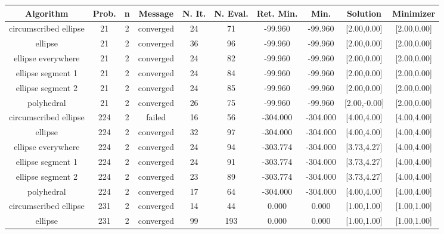 \begin{tiny}

\begin{center}
\begin{tabular}{ c c c c c c c c c c }
Algorithm & Prob. & n & Message & N. It. & N. Eval. & Ret. Min. & Min. & Solution & Minimizer \\
\hline
  circumscribed ellipse   &   21  &  2  & converged  &   24  &   71  &  -99.960   &  -99.960   & [2.00,0.00] & [2.00,0.00] \\
         ellipse          &   21  &  2  & converged  &   36  &   96  &  -99.960   &  -99.960   & [2.00,0.00] & [2.00,0.00] \\
    ellipse everywhere    &   21  &  2  & converged  &   24  &   82  &  -99.960   &  -99.960   & [2.00,0.00] & [2.00,0.00] \\
    ellipse segment 1     &   21  &  2  & converged  &   24  &   84  &  -99.960   &  -99.960   & [2.00,0.00] & [2.00,0.00] \\
    ellipse segment 2     &   21  &  2  & converged  &   24  &   85  &  -99.960   &  -99.960   & [2.00,0.00] & [2.00,0.00] \\
        polyhedral        &   21  &  2  & converged  &   26  &   75  &  -99.960   &  -99.960   & [2.00,-0.00] & [2.00,0.00] \\
  circumscribed ellipse   &  224  &  2  &   failed   &   16  &   56  &  -304.000  &  -304.000  & [4.00,4.00] & [4.00,4.00] \\
         ellipse          &  224  &  2  & converged  &   32  &   97  &  -304.000  &  -304.000  & [4.00,4.00] & [4.00,4.00] \\
    ellipse everywhere    &  224  &  2  & converged  &   24  &   94  &  -303.774  &  -304.000  & [3.73,4.27] & [4.00,4.00] \\
    ellipse segment 1     &  224  &  2  & converged  &   24  &   91  &  -303.774  &  -304.000  & [3.73,4.27] & [4.00,4.00] \\
    ellipse segment 2     &  224  &  2  & converged  &   23  &   89  &  -303.774  &  -304.000  & [3.73,4.27] & [4.00,4.00] \\
        polyhedral        &  224  &  2  & converged  &   17  &   64  &  -304.000  &  -304.000  & [4.00,4.00] & [4.00,4.00] \\
  circumscribed ellipse   &  231  &  2  & converged  &   14  &   44  &   0.000    &   0.000    & [1.00,1.00] & [1.00,1.00] \\
         ellipse          &  231  &  2  & converged  &   99  &  193  &   0.000    &   0.000    & [1.00,1.00] & [1.00,1.00] \\

\end{tabular}
\end{center}
\end{tiny}
